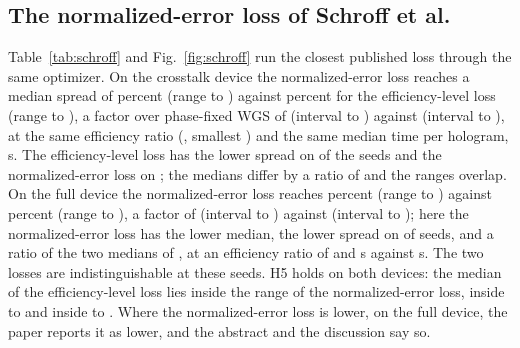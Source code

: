 \subsection{The normalized-error loss of Schroff et al.}

\begin{table}[t]
\centering\small
\caption{The efficiency-level loss of the refinement against the normalized-error loss of Schroff et al., both through the same warm start, device model, conjugate-gradient optimizer and safeguard, on the lattice task: $n$ seeds, median and range of the spread $\sigma$, geometric-mean factor over phase-fixed WGS with its 95 percent interval, median efficiency ratio and median seconds per hologram.}
\label{tab:schroff}
\resizebox{\textwidth}{!}{}
\end{table}

Table~\ref{tab:schroff} and Fig.~\ref{fig:schroff} run the closest published loss through the same optimizer. On the crosstalk device the normalized-error loss reaches a median spread of \schroffXSig{} percent (range \schroffXSigMin{} to \schroffXSigMax{}) against \ablBFullSig{} percent for the efficiency-level loss (range \ablBFullSigMin{} to \ablBFullSigMax{}), a factor over phase-fixed WGS of \schroffXFac{} (interval \schroffXFacLo{} to \schroffXFacHi{}) against \ratioOneGm{} (interval \ratioOneCiLo{} to \ratioOneCiHi{}), at the same efficiency ratio (\schroffXEffRatio{}, smallest \schroffXEffRatioMin{}) and the same median time per hologram, \schroffXSeconds{} s. The efficiency-level loss has the lower spread on \schroffXDefaultBeats{} of the \schroffXN{} seeds and the normalized-error loss on \schroffXBeatsDefault{}; the medians differ by a ratio of \schroffXRatio{} and the ranges overlap. On the full device the normalized-error loss reaches \schroffFSig{} percent (range \schroffFSigMin{} to \schroffFSigMax{}) against \ablBFFullSig{} percent (range \ablBFFullSigMin{} to \ablBFFullSigMax{}), a factor of \schroffFFac{} (interval \schroffFFacLo{} to \schroffFFacHi{}) against \ratioOneFullGm{} (interval \ratioOneFullCiLo{} to \ratioOneFullCiHi{}); here the normalized-error loss has the lower median, the lower spread on \schroffFBeatsDefault{} of \schroffFN{} seeds, and a ratio of the two medians of \schroffFRatio{}, at an efficiency ratio of \schroffFEffRatio{} and \schroffFSeconds{} s against \secBFMedian{} s. The two losses are indistinguishable at these seeds. H5 holds on both devices: the median of the efficiency-level loss lies inside the range of the normalized-error loss, \ablBFullSig{} inside \schroffXSigMin{} to \schroffXSigMax{} and \ablBFFullSig{} inside \schroffFSigMin{} to \schroffFSigMax{}. Where the normalized-error loss is lower, on the full device, the paper reports it as lower, and the abstract and the discussion say so.

